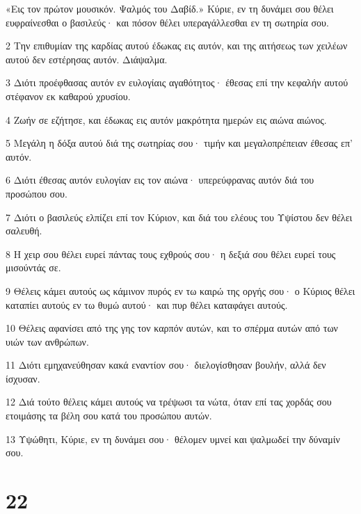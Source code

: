 \par «Εις τον πρώτον μουσικόν. Ψαλμός του Δαβίδ.» Κύριε, εν τη δυνάμει σου θέλει ευφραίνεσθαι ο βασιλεύς· και πόσον θέλει υπεραγάλλεσθαι εν τη σωτηρία σου.
\par 2 Την επιθυμίαν της καρδίας αυτού έδωκας εις αυτόν, και της αιτήσεως των χειλέων αυτού δεν εστέρησας αυτόν. Διάψαλμα.
\par 3 Διότι προέφθασας αυτόν εν ευλογίαις αγαθότητος· έθεσας επί την κεφαλήν αυτού στέφανον εκ καθαρού χρυσίου.
\par 4 Ζωήν σε εζήτησε, και έδωκας εις αυτόν μακρότητα ημερών εις αιώνα αιώνος.
\par 5 Μεγάλη η δόξα αυτού διά της σωτηρίας σου· τιμήν και μεγαλοπρέπειαν έθεσας επ' αυτόν.
\par 6 Διότι έθεσας αυτόν ευλογίαν εις τον αιώνα· υπερεύφρανας αυτόν διά του προσώπου σου.
\par 7 Διότι ο βασιλεύς ελπίζει επί τον Κύριον, και διά του ελέους του Υψίστου δεν θέλει σαλευθή.
\par 8 Η χειρ σου θέλει ευρεί πάντας τους εχθρούς σου· η δεξιά σου θέλει ευρεί τους μισούντάς σε.
\par 9 Θέλεις κάμει αυτούς ως κάμινον πυρός εν τω καιρώ της οργής σου· ο Κύριος θέλει καταπίει αυτούς εν τω θυμώ αυτού· και πυρ θέλει καταφάγει αυτούς.
\par 10 Θέλεις αφανίσει από της γης τον καρπόν αυτών, και το σπέρμα αυτών από των υιών των ανθρώπων.
\par 11 Διότι εμηχανεύθησαν κακά εναντίον σου· διελογίσθησαν βουλήν, αλλά δεν ίσχυσαν.
\par 12 Διά τούτο θέλεις κάμει αυτούς να τρέψωσι τα νώτα, όταν επί τας χορδάς σου ετοιμάσης τα βέλη σου κατά του προσώπου αυτών.
\par 13 Υψώθητι, Κύριε, εν τη δυνάμει σου· θέλομεν υμνεί και ψαλμωδεί την δύναμίν σου.

\chapter{22}

